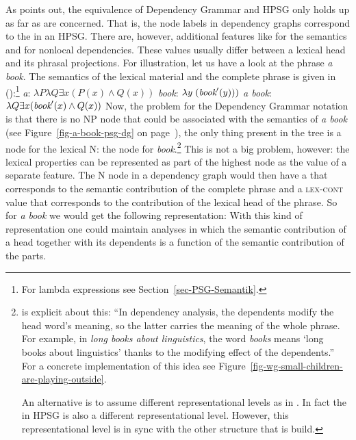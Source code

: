 As \citet{Oliva2003a} points out, the equivalence of Dependency Grammar and HPSG only holds up as far
as \headvs are concerned.
That is, the node labels in dependency graphs correspond to the \headvs in
an HPSG. There are, however, additional features like \cont for the semantics and \slasch for
nonlocal dependencies. These values usually differ between a lexical head and its phrasal
projections. For illustration, let us have a look at the phrase \emph{a book}. The semantics of the
lexical material and the complete phrase is given in ():\footnote{
  For lambda expressions see Section~\ref{sec-PSG-Semantik}.
}
\eal
\ex \emph{a}: $\lambda P \lambda Q \exists x (P(x) \wedge Q(x))$
\ex \emph{book}: $\lambda y\;(\textit{book}'(y)))$
\ex \emph{a book}: $\lambda Q \exists x (\textit{book}'(x) \wedge Q(x))$
\zl
Now, the problem for the Dependency Grammar notation is that there is no NP node that could be
associated with the semantics of \emph{a book} (see Figure~\ref{fig-a-book-psg-dg} on page~\pageref{fig-a-book-psg-dg}), the only thing present in the tree is a node for the
lexical N: the node for \emph{book}.\footnote{
  \citet[--392]{Hudson2003a}\indexwg is explicit about this: ``In dependency analysis, the dependents modify the head
    word's meaning, so the latter carries the meaning of the whole phrase. For example, in
    \emph{long books about linguistics}, the word \emph{books} means `long books about linguistics'
    thanks to the modifying effect of the dependents.'' For a concrete implementation of this idea
    see Figure~\vref{fig-wg-small-children-are-playing-outside}.

   An alternative is to assume different representational levels as in \mtt \citep{Melcuk81a}. In fact the \contv in
   HPSG is also a different representational level. However, this representational level is in sync
   with the other structure that is build.
} This is not a big problem, however: the lexical
properties can be represented as part of the highest node as the value of a separate feature. The N
node in a dependency graph would then have a \contv that corresponds to the semantic contribution of
the complete phrase and a \textsc{lex-cont} value that corresponds to the contribution of the lexical
head of the phrase. So for \emph{a book} we would get the following representation:
\ea
{}
\z
With this kind of representation one could maintain analyses in which the semantic contribution of a
head together with its dependents is a function of the semantic contribution of the parts. 

